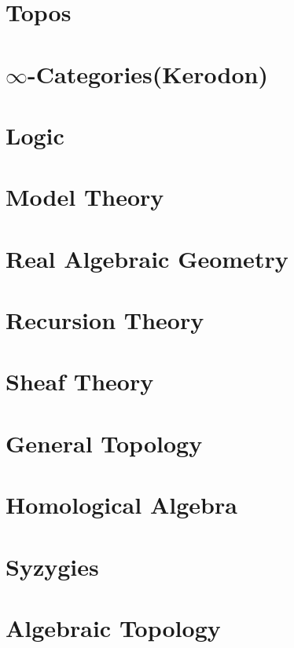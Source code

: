 \documentclass{ModulEN}
\begin{document}
		
		
	\part{Topos}
	
	\part{$\infty$-Categories(Kerodon)}
	
	\part{Logic}
	
	\part{Model Theory}
	
	\part{Real Algebraic Geometry}
	
	\part{Recursion Theory}
	
	\part{Sheaf Theory}
	
	\part{General Topology}
	
	\part{Homological Algebra}
		
		
	\part{Syzygies}
	
		
	
	\part{Algebraic Topology}
	
\end{document}
